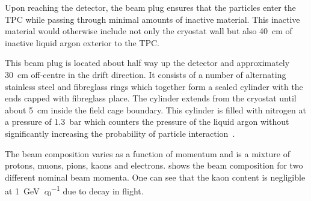 Upon reaching the detector, the beam plug ensures that the particles enter the TPC while passing through minimal amounts of inactive material.
This inactive material would otherwise include not only the cryostat wall but also \SI{40}{\cm} of inactive liquid argon exterior to the TPC.

This beam plug is located about half way up the detector and approximately \SI{30}{\cm} off-centre in the drift direction.
It consists of a number of alternating stainless steel and fibreglass rings which together form a sealed cylinder with the ends capped with fibreglass place.
The cylinder extends from the cryostat until about \SI{5}{\cm} inside the field cage boundary.
This cylinder is filled with nitrogen at a pressure of \SI{1.3}{\bar} which counters the pressure of the liquid argon without significantly increasing the probability of particle interaction~\cite{protodunePerformance}.

The beam composition varies as a function of momentum and is a mixture of protons, muons, pions, kaons and electrons.
 shows the beam composition for two different nominal beam momenta.
One can see that the kaon content is negligible at \SI{1}{\GeV\per\clight} due to decay in flight.

